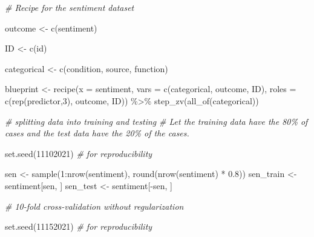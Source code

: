 \documentclass[
  english,
  man]{apa6}
\newenvironment{Shaded}{\begin{snugshade}}{\end{snugshade}}
\newcommand{\AttributeTok}[1]{\textcolor[rgb]{0.77,0.63,0.00}{#1}}
\newcommand{\CommentTok}[1]{\textcolor[rgb]{0.56,0.35,0.01}{\textit{#1}}}
\newcommand{\DecValTok}[1]{\textcolor[rgb]{0.00,0.00,0.81}{#1}}
\newcommand{\FloatTok}[1]{\textcolor[rgb]{0.00,0.00,0.81}{#1}}
\newcommand{\FunctionTok}[1]{\textcolor[rgb]{0.00,0.00,0.00}{#1}}
\newcommand{\NormalTok}[1]{#1}
\newcommand{\OtherTok}[1]{\textcolor[rgb]{0.56,0.35,0.01}{#1}}
\newcommand{\SpecialCharTok}[1]{\textcolor[rgb]{0.00,0.00,0.00}{#1}}
\newcommand{\StringTok}[1]{\textcolor[rgb]{0.31,0.60,0.02}{#1}}
\begin{document}
\begin{Shaded}
\begin{Highlighting}[]
\CommentTok{\# Recipe for the sentiment dataset}

\NormalTok{outcome }\OtherTok{\textless{}{-}} \FunctionTok{c}\NormalTok{(}\StringTok{\textquotesingle{}sentiment\textquotesingle{}}\NormalTok{)}

\NormalTok{ID }\OtherTok{\textless{}{-}} \FunctionTok{c}\NormalTok{(}\StringTok{\textquotesingle{}id\textquotesingle{}}\NormalTok{)}

\NormalTok{categorical }\OtherTok{\textless{}{-}} \FunctionTok{c}\NormalTok{(}\StringTok{\textquotesingle{}condition\textquotesingle{}}\NormalTok{, }\StringTok{\textquotesingle{}source\textquotesingle{}}\NormalTok{, }\StringTok{\textquotesingle{}function\textquotesingle{}}\NormalTok{)}

\NormalTok{ blueprint }\OtherTok{\textless{}{-}} \FunctionTok{recipe}\NormalTok{(}\AttributeTok{x  =}\NormalTok{ sentiment,}
                    \AttributeTok{vars  =} \FunctionTok{c}\NormalTok{(categorical, outcome, ID),}
                    \AttributeTok{roles =} \FunctionTok{c}\NormalTok{(}\FunctionTok{rep}\NormalTok{(}\StringTok{\textquotesingle{}predictor\textquotesingle{}}\NormalTok{,}\DecValTok{3}\NormalTok{), }\StringTok{\textquotesingle{}outcome\textquotesingle{}}\NormalTok{, }\StringTok{\textquotesingle{}ID\textquotesingle{}}\NormalTok{)) }\SpecialCharTok{\%\textgreater{}\%}
  \FunctionTok{step\_zv}\NormalTok{(}\FunctionTok{all\_of}\NormalTok{(categorical)) }


\CommentTok{\# splitting data into training and testing}
\CommentTok{\# Let the training data have the 80\% of cases and the test data have the 20\% of the cases.}

\FunctionTok{set.seed}\NormalTok{(}\DecValTok{11102021}\NormalTok{)  }\CommentTok{\# for reproducibility}
  
\NormalTok{sen      }\OtherTok{\textless{}{-}} \FunctionTok{sample}\NormalTok{(}\DecValTok{1}\SpecialCharTok{:}\FunctionTok{nrow}\NormalTok{(sentiment), }\FunctionTok{round}\NormalTok{(}\FunctionTok{nrow}\NormalTok{(sentiment) }\SpecialCharTok{*} \FloatTok{0.8}\NormalTok{))}
\NormalTok{sen\_train  }\OtherTok{\textless{}{-}}\NormalTok{ sentiment[sen, ]}
\NormalTok{sen\_test  }\OtherTok{\textless{}{-}}\NormalTok{ sentiment[}\SpecialCharTok{{-}}\NormalTok{sen, ]}

\CommentTok{\# 10{-}fold cross{-}validation without regularization}

\FunctionTok{set.seed}\NormalTok{(}\DecValTok{11152021}\NormalTok{) }\CommentTok{\# for reproducibility}


\end{Highlighting}
\end{Shaded}
\end{document}
